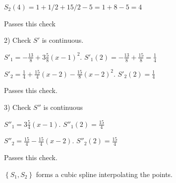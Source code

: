 \documentclass[12pt,letterpaper,noanswers]{exam}
\begin{document}
$S_2(4) = 1 + 1/2 + 15/2 - 5 = 1+8-5 = 4$

Passes this check

2) Check $S'$ is continuous.

$S'_1 = -\frac{13}{8} + 3\frac{5}{8}(x-1)^2$.  $S'_1(2) = -\frac{13}{8}+\frac{15}{8} = \frac{1}{4}$

$S'_2 = \frac{1}{4} + \frac{15}{4}(x-2) - \frac{15}{8}(x-2)^2$.  $S'_2(2) = \frac{1}{4} $

Passes this check.

3) Check $S''$ is continuous

$S''_1 =  3\frac{5}{4}(x-1)$.  $S''_1(2) = \frac{15}{4}$

$S''_2 = \frac{15}{4} - \frac{15}{4}(x-2)$.  $S''_2(2) = \frac{15}{4} $

Passes this check.

$\left\{S_1, S_2\right\}$ forms a cubic spline interpolating the points.





\end{document}
